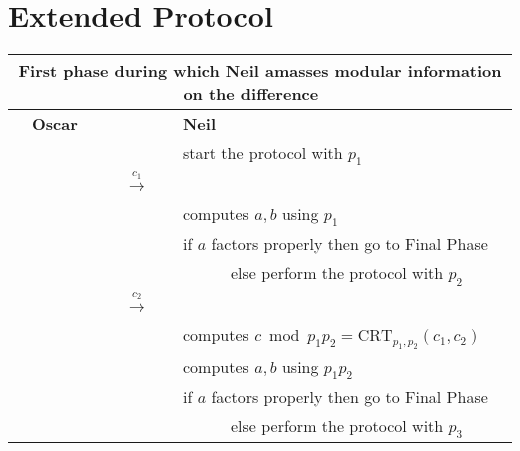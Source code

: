 \documentclass[11pt]{llncs}
\begin{document}
\nocite{rsync}
\nocite{wagner}



\appendix

\section{Extended Protocol}
\label{sec:extended}

\begin{center}
\begin{tabular}{lcl}\toprule
\multicolumn{3}{c}{{\sf First phase during which Neil amasses modular
information on the difference~~}} \\\midrule
~~{\bf Oscar}                      &                                                      &   {\bf Neil}~\\
                                   &                                                      &start the protocol with $p_1$~\\
                                   &~~{{\LARGE $\stackrel{c_1}{\longrightarrow}$}}~~      &   \\
                                   &                                                      &computes $a,b$ using $p_1$~\\
                                   &                                                      &if $a$ factors properly then go to {\sf Final Phase}\\
                                   &                                                      &~~~~~~else perform the protocol with $p_2$~~\\
                                   &~~{{\LARGE $\stackrel{c_2}{\longrightarrow}$}}~~      &   \\
                                   &                                                      &computes $c \bmod p_1 p_2=\mbox{CRT}_{p_1,p_2}(c_1,c_2)$~~\\
                                   &                                                      &computes $a,b$ using $p_1 p_2$~\\
                                   &                                                      &if $a$ factors properly then go to {\sf Final Phase}\\
                                   &                                                      &~~~~~~else perform the protocol with $p_3$~~\\

\end{tabular}
\end{center}
\end{document}
